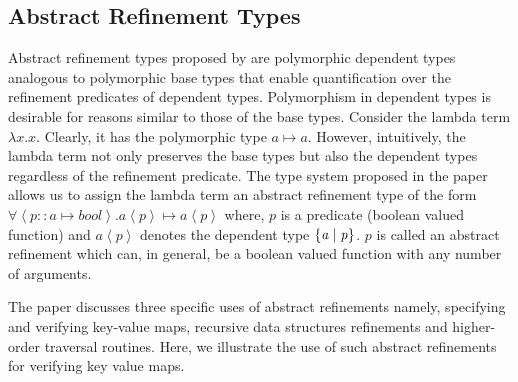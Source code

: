 \newcommand{\pr}[1]{\mathit{\left< #1 \right>}}

\subsection{Abstract Refinement Types}

Abstract refinement types proposed by \cite{rjhala:ESOP13} are polymorphic dependent types analogous to polymorphic base types that enable quantification over the refinement predicates of dependent types. 
Polymorphism in dependent types is desirable for reasons similar to those of the base types. Consider the lambda term $\lambda x. x$. Clearly, it has the polymorphic 
type $a \mapsto a$. However, intuitively, the lambda term not only preserves the base types but also the dependent types regardless of the refinement predicate.
The type system proposed in the paper allows us to assign the lambda term an abstract refinement type of the form $\forall \pr{p::a \mapsto bool}. a\pr{p} \mapsto a\pr{p}$ where, $p$ is a predicate (boolean valued function) and $a\pr{p}$ denotes the dependent type $\mathit{\{ a \; | \; p\}}$. $p$ is called an abstract refinement which can, in general, be a boolean valued function with any number of arguments.

The paper discusses three specific uses of abstract refinements namely, specifying and verifying key-value maps, recursive data structures refinements and higher-order traversal routines. Here, we illustrate the use of such abstract refinements for verifying key value maps.

